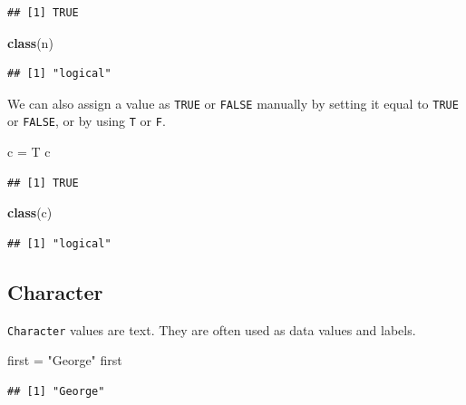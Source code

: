 \documentclass[
]{book}
\newenvironment{Shaded}{\begin{snugshade}}{\end{snugshade}}
\newcommand{\KeywordTok}[1]{\textcolor[rgb]{0.13,0.29,0.53}{\textbf{#1}}}
\newcommand{\NormalTok}[1]{#1}
\newcommand{\StringTok}[1]{\textcolor[rgb]{0.31,0.60,0.02}{#1}}
\begin{document}
\begin{verbatim}
## [1] TRUE
\end{verbatim}

\begin{Shaded}
\begin{Highlighting}[]
\KeywordTok{class}\NormalTok{(n)}
\end{Highlighting}
\end{Shaded}

\begin{verbatim}
## [1] "logical"
\end{verbatim}

We can also assign a value as \texttt{TRUE} or \texttt{FALSE} manually by setting it equal to \texttt{TRUE} or \texttt{FALSE}, or by using \texttt{T} or \texttt{F}.

\begin{Shaded}
\begin{Highlighting}[]
\NormalTok{c =}\StringTok{ }\NormalTok{T}
\NormalTok{c}
\end{Highlighting}
\end{Shaded}

\begin{verbatim}
## [1] TRUE
\end{verbatim}

\begin{Shaded}
\begin{Highlighting}[]
\KeywordTok{class}\NormalTok{(c)}
\end{Highlighting}
\end{Shaded}

\begin{verbatim}
## [1] "logical"
\end{verbatim}

\hypertarget{character}{%
\subsection*{Character}\label{character}}

\texttt{Character} values are text. They are often used as data values and labels.

\begin{Shaded}
\begin{Highlighting}[]
\NormalTok{first =}\StringTok{ "George"}
\NormalTok{first }
\end{Highlighting}
\end{Shaded}

\begin{verbatim}
## [1] "George"
\end{verbatim}
\end{document}

